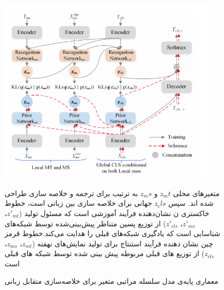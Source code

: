 \begin{figure}[!h]
	\begin{center}
		\includegraphics[height=9cm]{Variational Hierarchical Model.png}
	\end{center}
	\caption{معماری پایه‌‌ی مدل سلسله مراتبی متغیر برای خلاصه‌سازی متقابل زبانی\cite{variational}}
	\label{fig:vahie_model}
	\medskip
	\small{
		متغیرهای محلی $ z_mt $ و $ z_ms $ به ترتیب برای ترجمه و خلاصه سازی طراحی شده اند. سپس $ z_cls $ جهانی برای خلاصه سازی بین زبانی است، خطوط خاکستری ن نشان‌دهنده فرآیند آموزشی است که مسئول تولید
		($ z' _{mt} $، $ z'_{ms} $، $ z'_{cls} $)
		از توزیع پسین متناظر پیش‌بینی‌شده توسط شبکه‌های شناسایی است که یادگیری شبکه‌های قبلی را هدایت می‌کند.خطوط قرمز چین نشان دهنده فرآیند استنتاج برای تولید نمایش‌‌های نهفته
		($ z _{mt} $، $ z_{ms} $، $ z_{cls} $)
		از توزیع های قبلی مربوطه پیش بینی شده توسط شبکه های قبلی است  }
\end{figure}







